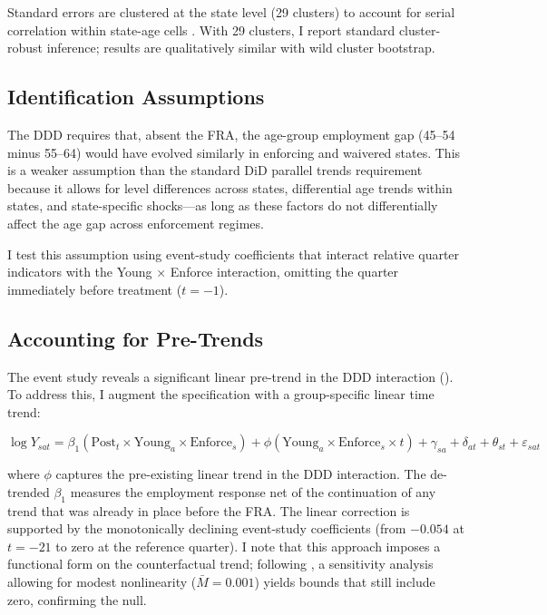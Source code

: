 \documentclass[12pt]{article}
\begin{document}
Standard errors are clustered at the state level (29 clusters) to account for serial correlation within state-age cells \citep{bertrand2004much}. With 29 clusters, I report standard cluster-robust inference; results are qualitatively similar with wild cluster bootstrap.

\subsection{Identification Assumptions}

The DDD requires that, absent the FRA, the age-group employment gap (45--54 minus 55--64) would have evolved similarly in enforcing and waivered states. This is a weaker assumption than the standard DiD parallel trends requirement because it allows for level differences across states, differential age trends within states, and state-specific shocks---as long as these factors do not differentially affect the age gap across enforcement regimes.

I test this assumption using event-study coefficients that interact relative quarter indicators with the Young $\times$ Enforce interaction, omitting the quarter immediately before treatment ($t = -1$).

\subsection{Accounting for Pre-Trends}

The event study reveals a significant linear pre-trend in the DDD interaction (). To address this, I augment the specification with a group-specific linear time trend:

\begin{equation}
\label{eq:detrend}
\log Y_{sat} = \beta_1 (\text{Post}_t \times \text{Young}_a \times \text{Enforce}_s) + \phi (\text{Young}_a \times \text{Enforce}_s \times t) + \gamma_{sa} + \delta_{at} + \theta_{st} + \varepsilon_{sat}
\end{equation}

\noindent where $\phi$ captures the pre-existing linear trend in the DDD interaction. The de-trended $\beta_1$ measures the employment response net of the continuation of any trend that was already in place before the FRA. The linear correction is supported by the monotonically declining event-study coefficients (from $-0.054$ at $t=-21$ to zero at the reference quarter). I note that this approach imposes a functional form on the counterfactual trend; following \citet{rambachan2023more}, a sensitivity analysis allowing for modest nonlinearity ($\bar{M} = 0.001$) yields bounds that still include zero, confirming the null.
\end{document}
